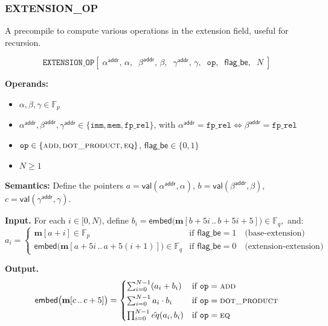 \documentclass{article}
\theoremstyle{definition}
\newcommand{\Fp}{\mathbb F_p}
\newcommand{\Fq}{\mathbb F_q}
\begin{document}
\subsubsection{EXTENSION\_OP}\label{extension_op_instruction}

A precompile to compute various operations in the extension field, useful for recursion.


\[
\texttt{EXTENSION\_OP}[\;\alpha^\textsf{addr},\, \alpha,\;\; \beta^\textsf{addr},\, \beta,\;\; \gamma^\textsf{addr},\, \gamma,\;\; \texttt{op},\;\; \textsf{flag\_be},\;\; N\;]
\]


\textbf{Operands:}
\begin{itemize}
    \item $\alpha, \beta, \gamma \in \Fp$
    \item $\alpha^\textsf{addr}, \beta^\textsf{addr}, \gamma^\textsf{addr} \in \{\texttt{imm}, \texttt{mem}, \texttt{fp\_rel}\}$, with $\alpha^\textsf{addr} = \texttt{fp\_rel} \Leftrightarrow \beta^\textsf{addr} = \texttt{fp\_rel}$
    \item $\texttt{op} \in \{\textsc{add}, \textsc{dot\_product}, \textsc{eq}\}$, $\textsf{flag\_be} \in \{0, 1\}$
    \item $N \geq 1$
\end{itemize}

\textbf{Semantics:} Define the pointers $a = \mathsf{val}(\alpha^\textsf{addr}, \alpha)$, $b = \mathsf{val}(\beta^\textsf{addr}, \beta)$, $c = \mathsf{val}(\gamma^\textsf{addr}, \gamma)$.

\textbf{Input.} For each $i \in [0, N)$, define
$
b_i = \mathsf{embed}\big(\textbf{m}[b + 5i \,..\, b + 5i + 5]\big) \in \Fq,
$
and:
\[
a_i =
\begin{cases}
\textbf{m}[a + i] \in \Fp & \text{if } \textsf{flag\_be} = 1 \quad \text{(base-extension)} \\[1mm]
\mathsf{embed}\big(\textbf{m}[a + 5i \,..\, a + 5(i + 1)]\big) \in \Fq & \text{if } \textsf{flag\_be} = 0 \quad \text{(extension-extension)}
\end{cases}
\]

\textbf{Output.}
\[
\mathsf{embed}\big(\textbf{m}[c \,..\, c + 5]\big) =
\begin{cases}
\sum_{i=0}^{N-1} (a_i + b_i) & \text{if } \texttt{op} = \textsc{add} \\[1mm]
\sum_{i=0}^{N-1} a_i \cdot b_i & \text{if } \texttt{op} = \textsc{dot\_product} \\[1mm]
\prod_{i=0}^{N-1} \hat{eq}(a_i, b_i) & \text{if } \texttt{op} = \textsc{eq}
\end{cases}
\]
\end{document}

